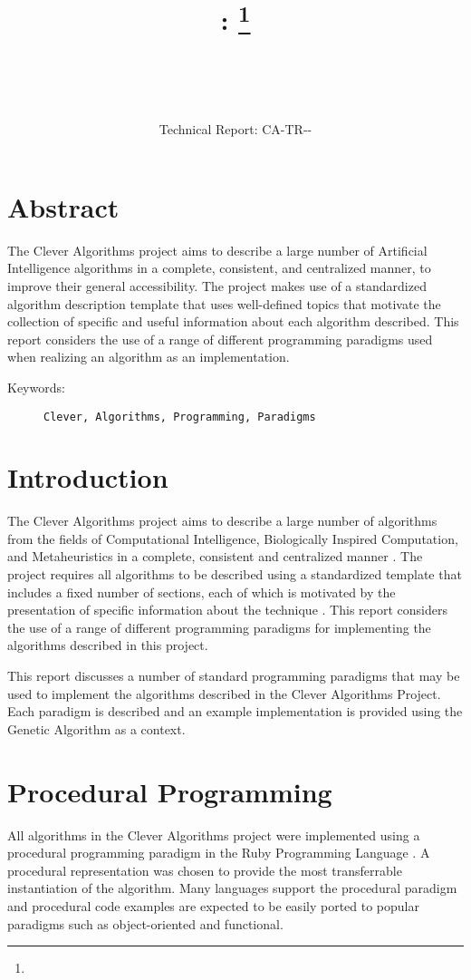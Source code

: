 \documentclass[a4paper, 11pt]{article}
\title{{\myreporttitle}: \myreportsubtitle\footnote{\myreportlicense}}
\author{\myreportauthor\\{\myreportemail}\\\small\myreportproject}
\date{\myreportfulldate\\{\small{Technical Report: CA-TR-{\myreportdate}-\myreportversion}}}
\begin{document}
\maketitle

\section*{Abstract} 
The Clever Algorithms project aims to describe a large number of Artificial Intelligence algorithms in a complete, consistent, and centralized manner, to improve their general accessibility. 
The project makes use of a standardized algorithm description template that uses well-defined topics that motivate the collection of specific and useful information about each algorithm described.
This report considers the use of a range of different programming paradigms used when realizing an algorithm as an implementation.

\begin{description}
	\item[Keywords:] {\small\texttt{Clever, Algorithms, Programming, Paradigms}}
\end{description} 

\section{Introduction}
\label{sec:introduction}
The Clever Algorithms project aims to describe a large number of algorithms from the fields of Computational Intelligence, Biologically Inspired Computation, and Metaheuristics in a complete, consistent and centralized manner \cite{Brownlee2010}.
The project requires all algorithms to be described using a standardized template that includes a fixed number of sections, each of which is motivated by the presentation of specific information about the technique \cite{Brownlee2010a}.
This report considers the use of a range of different programming paradigms for implementing the algorithms described in this project.

This report discusses a number of standard programming paradigms that may be used to implement the algorithms described in the Clever Algorithms Project. Each paradigm is described and an example implementation is provided using the Genetic Algorithm as a context.

\section{Procedural Programming}
All algorithms in the Clever Algorithms project were implemented using a procedural programming paradigm in the Ruby Programming Language \cite{Brownlee2010au}. A procedural representation was chosen to provide the most transferrable instantiation of the algorithm. Many languages support the procedural paradigm and procedural code examples are expected to be easily ported to popular paradigms such as object-oriented and functional.
\end{document}
